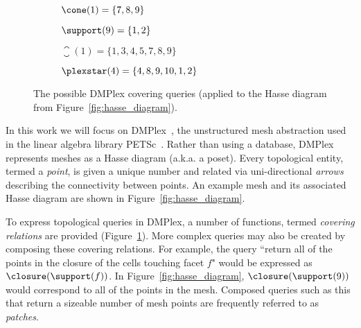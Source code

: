 \begin{figure}
  \centering
  \begin{subfigure}{0.45\textwidth}
    \centering
    \caption{$\cone(1) = \{7,8,9\}$}
  \end{subfigure}
  \begin{subfigure}{0.45\textwidth}
    \centering
    \caption{$\support(9) = \{1,2\}$}
  \end{subfigure}
  \begin{subfigure}{0.45\textwidth}
    \centering
    \caption{$\closure(1) = \{1,3,4,5,7,8,9\}$}
  \end{subfigure}
  \begin{subfigure}{0.45\textwidth}
    \centering
    \caption{$\plexstar(4) = \{4,8,9,10,1,2\}$}
  \end{subfigure}

  \caption{The possible DMPlex covering queries (applied to the Hasse diagram from Figure~\ref{fig:hasse_diagram}).}
  \label{fig:plex_restrictions}
\end{figure}

In this work we will focus on DMPlex~\cite{knepleyMeshAlgorithmsPDE2009,langeEfficientMeshManagement2016,knepleyUnstructuredOverlappingMesh2015}, the unstructured mesh abstraction used in the linear algebra library PETSc~\cite{petsc-web-page,petsc-user-ref,petsc-efficient}.
Rather than using a database, DMPlex represents meshes as a Hasse diagram (a.k.a. a \gls{poset}).
Every topological entity, termed a \textit{point}, is given a unique number and related via uni-directional \textit{arrows} describing the connectivity between points.
An example mesh and its associated Hasse diagram are shown in Figure~\ref{fig:hasse_diagram}.

To express topological queries in DMPlex, a number of functions, termed \textit{covering relations} are provided (Figure~\ref{fig:plex_restrictions}).
More complex queries may also be created by composing these covering relations.
For example, the query ``return all of the points in the closure of the cells touching facet $f$" would be expressed as $\closure(\support(f))$.
In Figure~\ref{fig:hasse_diagram}, $\closure(\support(9))$ would correspond to all of the points in the mesh.
Composed queries such as this that return a sizeable number of mesh points are frequently referred to as \textit{patches}.

